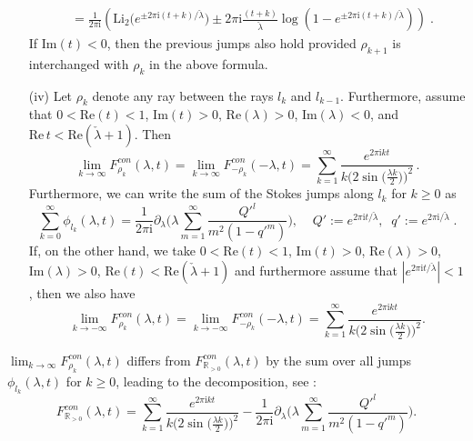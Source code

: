 \documentclass[a4paper,12pt,justification=centering]{article}
\numberwithin{equation}{section}
\newcommand{\BR}{{\mathbb R}}
\newcommand{\I}{{\mathrm i}}
\newcommand{\la}{{\lambda}}
\theoremstyle{plain}%
\theoremstyle{definition}
\begin{document}
\begin{itemize}
\begin{align}
    &= \frac{1}{2\pi \I} \left( \mathrm{Li}_2\big(e^{\pm 2\pi \I(t+k)/\check \lambda}\big) \pm 2\pi \I \frac{(t+k)}{\check \lambda} \log \left(1- e^{\pm 2\pi \I(t+k)/\check \lambda} \right)\right)\;.
\end{align}
If $\mathrm{Im}(t)<0$, then the previous jumps also hold provided $\rho_{k+1}$ is interchanged with $\rho_{k}$ in the above formula. \\
\item[(iv)]   Let $\rho_k$ denote any ray between the rays $l_{k}$ and $l_{k-1}$. Furthermore, assume that $0<\mathrm{Re}(t)<1$, $\mathrm{Im}(t)>0$, $\mathrm{Re}(\lambda)>0$, $\mathrm{Im}(\lambda)<0$, and $\mathrm{Re}\, t < \mathrm{Re} (\check{\lambda}+1)$. Then
\begin{equation}
    \lim_{k\to \infty}F^{con}_{\rho_k}(\lambda,t)=\lim_{k\to \infty}F^{con}_{-\rho_k}(-\lambda,t)=\sum_{k=1}^\infty\frac{e^{2\pi \I k t}}{k\big(2\sin\big(\frac{\lambda k}{2}\big)\big)^2}\,.
\end{equation}
Furthermore, we can write the sum of the Stokes jumps along $l_k$ for $k\geq 0$ as
\begin{equation}
    \sum_{k=0}^{\infty}\phi_{l_k}(\lambda,t)=\frac{1}{2\pi \I }\partial_{\lambda}\Big(\lambda \sum_{m=1}^{\infty}\frac{Q'^l}{m^2(1-q'^m)}\Big), \;\;\;\; Q':=e^{2\pi \I t/\check\lambda},\;\; q':=e^{2\pi \I/\check{\lambda}}\;.
\end{equation}
If, on the other hand, we take $0<\mathrm{Re}(t)<1$, $\mathrm{Im}(t)>0$, $\mathrm{Re}(\lambda)>0$, $\mathrm{Im}(\lambda)>0$, $\mathrm{Re}(t)<\mathrm{Re}(\check\lambda +1)$ and furthermore assume that $|e^{2\pi \I t/\check{\lambda}}|<1$, then we also have
\begin{equation}
    \lim_{k\to -\infty}F^{con}_{\rho_k}(\lambda,t)=\lim_{k\to -\infty}F^{con}_{-\rho_k}(-\lambda,t)=\sum_{k=1}^\infty\frac{e^{2\pi \I k t}}{k\big(2\sin\big(\frac{\lambda k}{2}\big)\big)^2}.
\end{equation}
 \end{itemize}

$\lim_{k\to \infty}F^{con}_{\rho_k}(\lambda,t)$ differs from $F^{con}_{\mathbb{R}_{>0}}(\la,t)$ by the sum over all jumps 
$\phi_{l_k}(\lambda,t)$ for $k\geq 0$, leading to the decomposition, see \cite{Alim:2021ukq,Alim:2021mhp}:
\begin{equation}\label{Fnp-decomp}
F^{con}_{\BR_{>0}}(\la,t)= \sum_{k=1}^\infty\frac{e^{2\pi \I k t}}{k\big(2\sin\big(\frac{\lambda k}{2}\big)\big)^2}  -\frac{1}{2\pi \I }\partial_{\lambda}\Big(\lambda \sum_{m=1}^{\infty}\frac{Q'^l}{m^2(1-q'^m)}\Big).
\end{equation}
\end{document}
